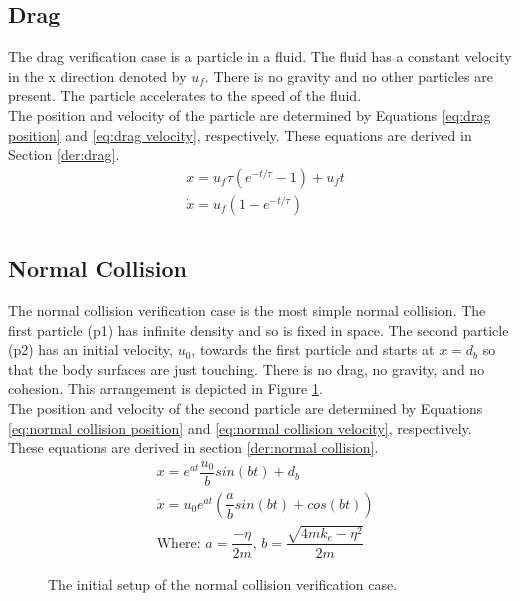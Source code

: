 \documentclass[a4paper,11pt,titlepage]{report}
\begin{document}
\subsection{Drag}
\label{sec:drag verification}
The drag verification case is a particle in a fluid. The fluid has a constant velocity in the x direction denoted by $u_f$. There is no gravity and no other particles are present. The particle accelerates to the speed of the fluid.
\\The position and velocity of the particle are determined by Equations \ref{eq:drag position} and \ref{eq:drag velocity}, respectively. These equations are derived in Section \ref{der:drag}.
\begin{align}
&x = u_f \tau (e^{-t/\tau} - 1) + u_f t \label{eq:drag position} \\
&\dot{x} = u_f (1 - e^{-t/\tau}) \label{eq:drag velocity} \\
\end{align}
\subsection{Normal Collision}
\label{sec:normal collision verification}
The normal collision verification case is the most simple normal collision. The first particle (p1) has infinite density and so is fixed in space. The second particle (p2) has an initial velocity, $u_0$, towards the first particle and starts at $x = d_b$ so that the body surfaces are just touching. There is no drag, no gravity, and no cohesion. This arrangement is depicted in Figure \ref{fig:normal collision}.
\\The position and velocity of the second particle are determined by Equations \ref{eq:normal collision position} and \ref{eq:normal collision velocity}, respectively. These equations are derived in section \ref{der:normal collision}.
\begin{align}
&x = e^{at} \dfrac{u_0}{b} sin(bt) + d_b \label{eq:normal collision position} \\
&\dot{x} = u_0 e^{at} (\dfrac{a}{b} sin(bt) + cos(bt)) \label{eq:normal collision velocity} \\
&\text{Where: } a = \dfrac{-\eta}{2m} \text{,    } b = \dfrac{\sqrt{4mk_e - \eta ^ 2}}{2m} \nonumber
\end{align}
\begin{figure}[!ht]
\centering

\caption{The initial setup of the normal collision verification case.}
\label{fig:normal collision}
\end{figure}
\end{document}
